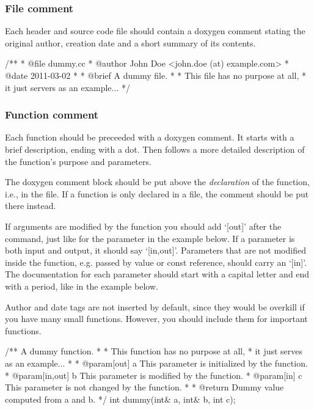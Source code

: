 \subsubsection{File comment}

Each header and source code file should contain a doxygen comment stating the
original author, creation date and a short summary of its contents.

\begin{code}
/**
 * @file   dummy.cc
 * @author John Doe <john.doe (at) example.com>
 * @date   2011-03-02
 *
 * @brief  A dummy file.
 *
 * This file has no purpose at all,
 * it just servers as an example...
 */
\end{code}

\subsubsection{Function comment}

Each function should be preceeded with a doxygen comment.
It starts with a brief description, ending with a dot. Then follows a more
detailed description of the function's purpose and parameters.

The doxygen comment block should be put above the \emph{declaration} of the
function, i.e., in the  file.  If a function is only declared in
a  file, the comment should be put there instead.

If arguments are modified by the function you should add
`[out]' after the  command, just like for the
parameter  in the example below. If a parameter is both input
and output, it should say `[in,out]'. Parameters that are not modified inside
the function, e.g. passed by value or const reference, should carry an `[in]'.
The documentation for each parameter should start with a capital letter and
end with a period, like in the example below.

Author and date tags are not inserted by default, since they would be
overkill if you have many small functions. However, you should include
them for important functions.

\begin{code}
/** A dummy function.
 *
 * This function has no purpose at all,
 * it just serves as an example...
 *
 * @param[out]     a This parameter is initialized by the function.
 * @param[in,out]  b This parameter is modified by the function.
 * @param[in]      c This parameter is not changed by the function.
 *
 * @return   Dummy value computed from a and b.
 */
int dummy(int& a, int& b, int c);
\end{code}

